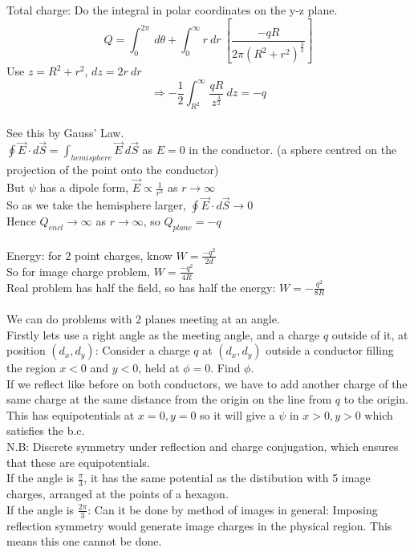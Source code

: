 \documentclass[a4paper,11pt]{article}
\begin{document}
Total charge: Do the integral in polar coordinates on the y-z plane.
$$Q=\int^{2\pi}_0~d\theta +\int^\infty_0 r~dr~\left[\dfrac{-qR}{2\pi(R^2+r^2)^\frac{3}{2}}\right]$$
Use $z=R^2+r^2$, $dz=2r~dr$
$$\Rightarrow -\frac{1}{2}\int^\infty_{R^2}\dfrac{qR}{z^\frac{3}{2}}~dz=-q$$
\\
See this by Gauss' Law.\\
$\oint \vec{E}\cdot d\vec{S}=\int_{hemisphere}\vec{E}~d\vec{S}$ as $E=0$ in the conductor. (a sphere centred on the projection of the point onto the conductor)\\
But $\psi$ has a dipole form, $\vec{E}\propto \frac{1}{r^3}$ as $r\rightarrow\infty$\\
So as we take the hemisphere larger, $\oint \vec{E}\cdot d\vec{S}\rightarrow 0$\\
Hence $Q_{encl}\rightarrow \infty$ as $r\rightarrow \infty$, so $Q_{plane}=-q$\\
\\
Energy: for 2 point charges, know $W=\frac{-q^2}{2d}$\\
So for image charge problem, $W=\frac{-q^2}{4R}$\\
Real problem has half the field, so has half the energy: $W=-\frac{q^2}{8R}$\\
\\
We can do problems with 2 planes meeting at an angle.\\
Firstly lets use a right angle as the meeting angle, and a charge $q$ outside of it, at position $(d_x,d_y)$:
Consider a charge $q$ at $(d_x,d_y)$ outside a conductor filling the region $x<0$ and $y<0$, held at $\phi=0$. Find $\phi$.\\
If we reflect like before on both conductors, we have to add another charge of the same charge at the same distance from the origin on the line from $q$ to the origin.\\
This has equipotentials at $x=0,y=0$ so it will give a $\psi$ in $x>0,y>0$ which satisfies the b.c.\\
N.B: Discrete symmetry under reflection and charge conjugation, which ensures that these are equipotentials.\\
If the angle is $\frac{\pi}{3}$, it has the same potential as the distibution with 5 image charges, arranged at the points of a hexagon.\\
If the angle is $\frac{2\pi}{3}$: Can it be done by method of images in general: Imposing reflection symmetry would generate image charges in the physical region. This means this one cannot be done.\\
\end{document}
